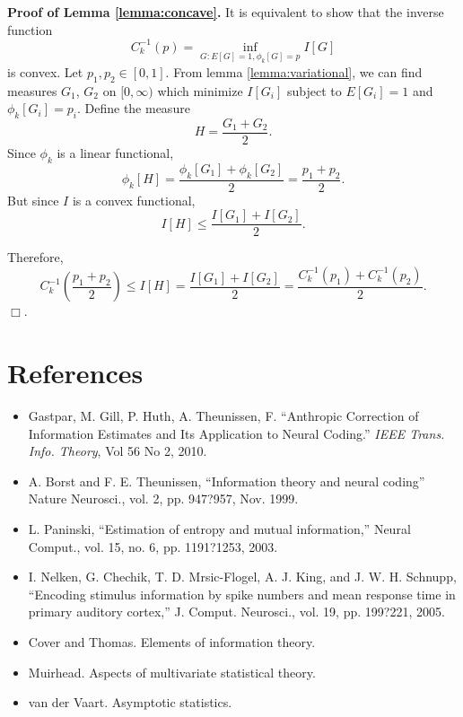 \documentclass[12pt]{article}
\begin{document}
\textbf{Proof of Lemma \ref{lemma:concave}.}
It is equivalent to show that the inverse function
\[
C^{-1}_k(p) = \inf_{G: E[G] = 1, \phi_k[G] = p} I[G]
\]
is convex.  Let $p_1, p_2 \in [0,1]$.  From
lemma \ref{lemma:variational}, we can find measures $G_1$, $G_2$ on
$[0,\infty)$ which minimize $I[G_i]$ subject to $E[G_i] = 1$ and
$\phi_k[G_i] = p_i$.  Define the measure
\[
H = \frac{G_1 + G_2}{2}.
\]
Since $\phi_k$ is a linear functional,
\[
\phi_k[H] = \frac{\phi_k[G_1] + \phi_k[G_2]}{2} = \frac{p_1 + p_2}{2}.
\]
But since $I$ is a convex functional,
\[
I[H] \leq \frac{I[G_1] + I[G_2]}{2}.
\]

Therefore,
\[
C^{-1}_k\left(\frac{p_1 + p_2}{2}\right) \leq I[H] = \frac{I[G_1] + I[G_2]}{2} = \frac{C^{-1}_k(p_1) + C^{-1}_k(p_2)}{2}.
\]
$\Box$.

\section{References}
\begin{itemize}
\item Gastpar, M.  Gill, P.  Huth, A.  Theunissen, F. ``Anthropic Correction of Information Estimates and Its Application to Neural Coding.'' \emph{IEEE Trans. Info. Theory}, Vol 56 No 2, 2010.
\item  A. Borst and F. E. Theunissen, ``Information theory and neural coding''
Nature Neurosci., vol. 2, pp. 947?957, Nov. 1999.
\item L. Paninski, ``Estimation of entropy and mutual information,'' Neural
Comput., vol. 15, no. 6, pp. 1191?1253, 2003.
\item I. Nelken, G. Chechik, T. D. Mrsic-Flogel, A. J. King, and J. W. H.
Schnupp, ``Encoding stimulus information by spike numbers and mean
response time in primary auditory cortex,'' J. Comput. Neurosci., vol.
19, pp. 199?221, 2005.
\item Cover and Thomas.  Elements of information theory.
\item Muirhead.  Aspects of multivariate statistical theory.
\item van der Vaart.  Asymptotic statistics.
\end{itemize}
\end{document}
